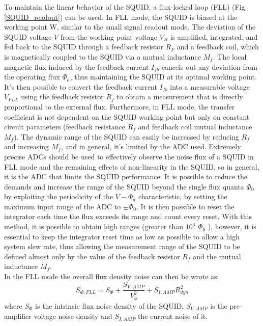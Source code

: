 \documentclass[12pt,a4paper]{report}
\begin{document}
    To maintain the linear behavior of the SQUID, a flux-locked loop (FLL) (Fig. \ref{SQUID_readout}) can be used. In FLL mode, the SQUID is biased at the working point W, similar to the small signal readout mode. The deviation of the SQUID voltage \(V\) from the working point voltage \(V_B\) is amplified, integrated, and fed back to the SQUID through a feedback resistor \(R_F\) and a feedback coil, which is magnetically coupled to the SQUID via a mutual inductance \(M_f\). The local magnetic flux induced by the feedback current $I_{fb}$ cancels out any deviation from the operating flux $\Phi_a$, thus maintaining the SQUID at its optimal working point. It's then possible to convert the feedback current $I_{fb}$ into a measurable voltage $V_{FLL}$ using the feedback resistor $R_f$ to obtain a measurement that is directly proportional to the external flux. Furthermore, in FLL mode, the transfer coefficient is not dependent on the SQUID working point but only on constant circuit parameters (feedback resistance $R_f$ and feedback coil mutual inductance $M_f$). The dynamic range of the SQUID can easily be increased by reducing $R_f$ and increasing $M_f$, and in general, it's limited by the ADC used. Extremely precise ADCs should be used to effectively observe the noise flux of a SQUID in FLL mode and the remaining effects of non-linearity in the SQUID, so in general, it is the ADC that limits the SQUID performance. It is possible to reduce the demands and increase the range of the SQUID beyond the single flux quanta $\Phi_0$ by exploiting the periodicity of the $V-\Phi_a$ characteristic, by setting the maximum input range of the ADC to $\pm \Phi_0$. It is then possible to reset the integrator each time the flux exceeds its range and count every reset. With this method, it is possible to obtain high ranges (greater than $10^4$ $\Phi_0$ \cite{SQUID_dinamic_range}), however, it is essential to keep the integrator reset time as low as possible to allow a high system slew rate, thus allowing the measurement range of the SQUID to be defined almost only by the value of the feedback resistor $R_f$ and the mutual inductance $M_f$. \\
    In the FLL mode the overall flux density noise can then be wrote as:
    \begin{equation}
    	S_{\Phi,FLL} = S_{\Phi} + \frac{S_{V,AMP}}{V_\phi^2} + S_{I,AMP}R^2_{dyn}
    	\label{CH2_SQUID_noise}
    \end{equation}
    where $S_{\Phi}$ is the intrinsic flux noise density of the SQUID, $S_{V,AMP}$ is the pre-amplifier voltage noise density and $S_{I,AMP}$ the current noise of it. 
\end{document}
